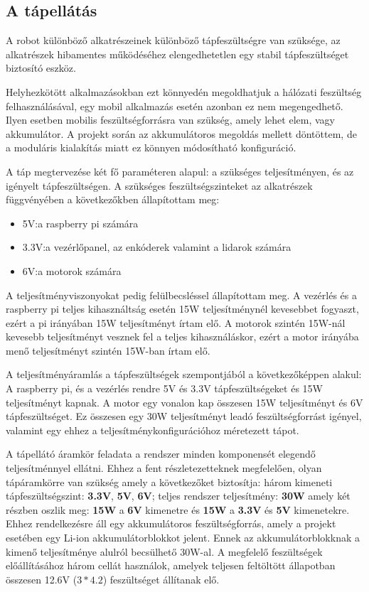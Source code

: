 
\subsection{A tápellátás}

A robot különböző alkatrészeinek különböző tápfeszültségre van szüksége, az
alkatrészek hibamentes működéséhez elengedhetetlen egy stabil tápfeszültséget
biztosító eszköz.

Helyhezkötött alkalmazásokban ezt könnyedén megoldhatjuk a hálózati feszültség
felhasználásával, egy mobil alkalmazás esetén azonban ez nem megengedhető. Ilyen
esetben mobilis feszültségforrásra van szükség, amely lehet elem, vagy
akkumulátor. A projekt során az akkumulátoros megoldás mellett döntöttem, de
a moduláris kialakítás miatt ez könnyen módosítható konfiguráció.

\medskip

A táp megtervezése két fő paraméteren alapul: a szükséges teljesítményen, és az
igényelt tápfeszültségen. A szükséges feszültségszinteket az alkatrészek
függvényében a következőkben állapítottam meg:

\begin{itemize}
\item 5V:\@ a raspberry pi számára
\item 3.3V:\@ a vezérlőpanel, az enkóderek valamint a lidarok számára
\item 6V:\@ a motorok számára
\end{itemize}

A teljesítményviszonyokat pedig felülbecsléssel állapítottam meg. A vezérlés és
a raspberry pi teljes kihasználtság esetén 15W teljesítménynél kevesebbet
fogyaszt, ezért a pi irányában 15W teljesítményt írtam elő. A motorok szintén
15W-nál kevesebb teljesítményt vesznek fel a teljes kihasználáskor, ezért a motor
irányába menő teljesítményt szintén 15W-ban írtam elő.

A teljesítményáramlás a tápfeszültségek szempontjából a következőképpen alakul:
A raspberry pi, és a vezérlés rendre 5V és 3.3V tápfeszültségeket és 15W
teljesítményt kapnak. A motor egy vonalon kap összesen 15W teljesítményt és 6V
tápfeszültséget. Ez összesen egy 30W teljesítményt leadó feszültségforrást
igényel, valamint egy ehhez a teljesítménykonfigurációhoz méretezett tápot.

A tápellátó áramkör feladata a rendszer minden komponensét elegendő
teljesítménnyel ellátni. Ehhez a fent részletezetteknek megfelelően, olyan
tápáramkörre van szükség amely a következőket biztosítja: három kimeneti
tápfeszültségszint: \textbf{3.3V}, \textbf{5V}, \textbf{6V}; teljes rendszer
teljesítmény: \textbf{30W} amely két részben oszlik meg: \textbf{15W} a
\textbf{6V} kimenetre és \textbf{15W} a \textbf{3.3V} és \textbf{5V} kimenetekre.
Ehhez rendelkezésre áll egy akkumulátoros feszültségforrás, amely a projekt
esetében egy Li-ion akkumulátorblokkot jelent. Ennek az akkumulátorblokknak a
kimenő teljesítménye alulról becsülhető 30W-al. A megfelelő feszültségek
előállításához három cellát használok, amelyek teljesen feltöltött állapotban
összesen 12.6V (\(3 * 4.2\)) feszültséget állítanak elő.

